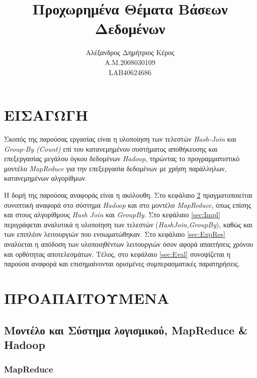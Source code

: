 \documentclass{article}
\newcommand{\en}[1]{\foreignlanguage{english}{#1}}
\begin{document}
\title{Προχωρημένα Θέματα Βάσεων Δεδομένων}
\author{Αλέξανδρος Δημήτριος Κέρος\\
	A.M.2008030109\\
	\en{LAB40624686}}
\date{}
\maketitle

\newpage
\tableofcontents

\newpage

\section{ΕΙΣΑΓΩΓΗ} \label{sec:Intro}

Σκοπός της παρούσας εργασίας είναι η υλοποίηση των τελεστών \emph{\en{Hash-Join}} και \emph{\en{Group-By (Count)}} επί του κατανεμημένου συστήματος αποθήκευσης και επεξεργασίας μεγάλου όγκου δεδομένων \emph{\en{Hadoop}}, τηρώντας το προγραμματιστικό μοντέλο \emph{\en{MapReduce}} για την επεξεργασία δεδομένων με χρήση παράλληλων, κατανεμημένων αλγορίθμων.

Η δομή της παρούσας αναφοράς είναι η ακόλουθη. Στο κεφάλαιο \ref{sec:Prelim} πραγματοποιείται συνοπτική αναφορά στο σύστημα \emph{\en{Hadoop}} και στο μοντέλο \emph{\en{MapReduce}}, όπως επίσης και στους αλγορίθμους \emph{\en{Hash Join}} και \emph{\en{GroupBy}}. Στο κεφάλαιο \ref{sec:Impl} περιγράφεται αναλυτικά η υλοποίηση των τελεστών (\emph{\en{HashJoin,GroupBy}}), καθώς και των επιπλέον λειτουργιών που ενσωματώθηκαν. Στο κεφάλαιο \ref{sec:ExpRes} αναλύεται η απόδοση των υλοποιηθέντων λειτουργιών όσον αφορά απαιτήσεις χρόνου και ορθότητας αποτελεσμάτων. Τέλος, στο κεφάλαιο \ref{sec:Eval} συνοψίζεται η παρούσα αναφορά και επισημαίνονται ορισμένες συμπερασματικές παρατηρήσεις.

\section{ΠΡΟΑΠΑΙΤΟΥΜΕΝΑ} \label{sec:Prelim}

\subsection{Μοντέλο και Σύστημα λογισμικού, \en{MapReduce \& Hadoop}} \label{subsec:HadoopMapReduce}
\subsubsection{\en{MapReduce}} \label{subsubsec:Mapreduce}
\end{document}
